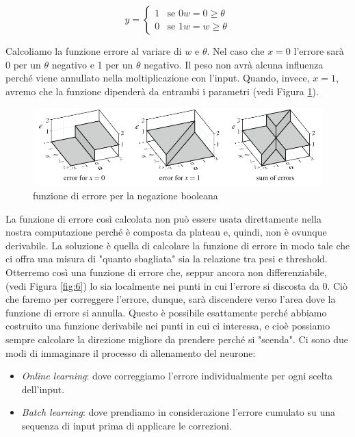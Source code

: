 \documentclass[10pt,a4paper]{article}
\begin{document}
\begin{equation}
	y = \begin{cases}
    1 & \text{se } 0w = 0 \geq \theta \\
    0 & \text{se } 1w = w \geq \theta
   \end{cases}
\end{equation} 

Calcoliamo la funzione errore al variare di $w$ e $\theta$. Nel caso che $x = 0$ l'errore sarà 0 per un $\theta$ negativo e 1 per un $\theta$ negativo. Il peso non avrà alcuna influenza perché viene annullato nella moltiplicazione con l'input. Quando, invece, $x = 1$, avremo che la funzione dipenderà da entrambi i parametri (vedi Figura \ref{fig:5}).

\begin{figure}
\centering
\includegraphics[scale=0.4]{img/error1.png}
\caption{funzione di errore per la negazione booleana}
\label{fig:5}
\end{figure}

La funzione di errore così calcolata non può essere usata direttamente nella nostra computazione perché è composta da plateau e, quindi, non è ovunque derivabile. La soluzione è quella di calcolare la funzione di errore in modo tale che ci offra una misura di "quanto sbagliata" sia la relazione tra pesi e threshold. Otterremo così una funzione di errore che, seppur ancora non differenziabile, (vedi Figura \ref{fig:6}) lo sia localmente nei punti in cui l'errore si discosta da $0$. Ciò che faremo per correggere l'errore, dunque, sarà discendere verso l'area dove la funzione di errore si annulla. Questo è possibile esattamente perché abbiamo costruito una funzione derivabile nei punti in cui ci interessa, e cioè possiamo sempre calcolare la direzione migliore da prendere perché si "scenda".
Ci sono due modi di immaginare il processo di allenamento del neurone:

\begin{itemize}
\item{\emph{Online learning}: dove correggiamo l'errore individualmente per ogni scelta dell'input.}
\item{\emph{Batch learning}: dove prendiamo in considerazione l'errore cumulato su una sequenza di input prima di applicare le correzioni.}
\end{itemize}
\end{document}
